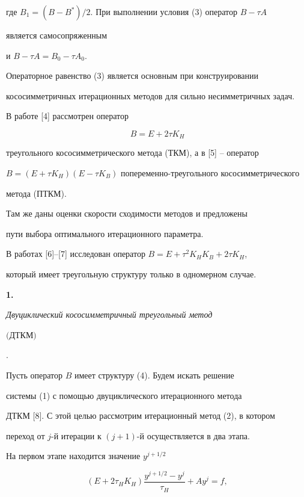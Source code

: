 где $B_1=(B-B^*)/2$. При выполнении условия (3) оператор $B-\tau A$ 


является самосопряженным 


и $B-\tau A=B_0-\tau A_0$. 


Операторное равенство (3) является основным при конструировании  


кососимметричных итерационных методов для сильно несимметричных задач.  


 


В работе [4] рассмотрен оператор 


\begin{equation} 


B=E+2\tau K_H 


\end{equation} 


треугольного кососимметрического метода (ТКМ), а в [5] -- оператор 


$B=(E+\tau K_H)(E-\tau K_B)$ попеременно-треугольного кососимметрического 


метода (ПТКМ). 


Там же даны оценки скорости сходимости методов и предложены  


пути выбора оптимального итерационного параметра. 


В работах [6]--[7] исследован оператор $B=E+\tau^2K_H K_B+2\tau K_H$, 


который имеет треугольную структуру только в одномерном случае. 


\medskip 


 


{\bf 1.} {\it Двуциклический кососимметричный треугольный метод  


$($ДТКМ\/$)$}.


Пусть оператор $B$ имеет структуру (4). Будем искать решение  


системы (1) с помощью двуциклического итерационного метода  


ДТКМ [8]. С этой целью рассмотрим итерационный метод (2), в котором 


переход от $j$-й итерации к $(j+1)$-й осуществляется в два этапа. 


 


На первом этапе находится значение $y^{j+1/2}$ 


\begin{equation} 


(E+2\tau_H K_H)\frac{y^{j+1/2}-y^j}{\tau_H}+A y^j=f, 


\end{equation} 



